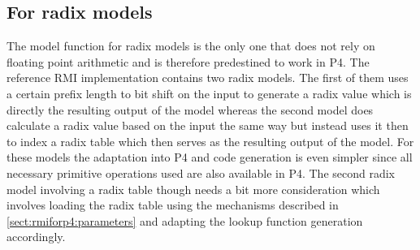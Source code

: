 \subsection{For radix models}
\label{sect:rmiforp4:radix}
The model function for radix models is the only one that does not rely on floating point arithmetic and is therefore predestined to work in P4. The reference RMI implementation contains two radix models. The first of them uses a certain prefix length to bit shift on the input to generate a radix value which is directly the resulting output of the model whereas the second model does calculate a radix value based on the input the same way but instead uses it then to index a radix table which then serves as the resulting output of the model. For these models the adaptation into P4 and code generation is even simpler since all necessary primitive operations used are also available in P4. The second radix model involving a radix table though needs a bit more consideration which involves loading the radix table using the mechanisms described in \ref{sect:rmiforp4:parameters} and adapting the lookup function generation accordingly.

\pagebreak

